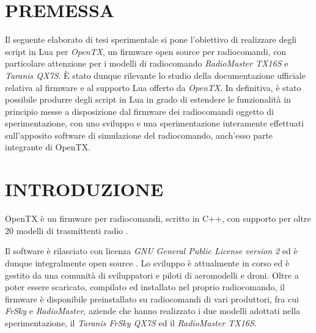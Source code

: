 \documentclass[a4paper, 12pt]{report} %
\begin{document}


\tableofcontents %
\fontsize{12pt}{14pt}\selectfont %

\titleformat{\chapter}[display]
{\Huge\bfseries}{}{0pt}{\thechapter\ \ \ \ }
\newpage
\clearpage
\chapter{PREMESSA}
Il seguente elaborato di tesi sperimentale si pone l'obiettivo di realizzare degli script in Lua per \emph{OpenTX}, un firmware open source per radiocomandi, con particolare attenzione per i modelli di radiocomando \emph{RadioMaster TX16S} e \emph{Taranis QX7S}. È stato dunque rilevante lo studio della documentazione ufficiale relativa al firmware e al supporto Lua offerto da \emph{OpenTX}. In definitiva, è stato possibile produrre degli script in Lua in grado di estendere le funzionalità in principio messe a disposizione dal firmware dei radiocomandi oggetto di sperimentazione, con uno sviluppo e una sperimentazione interamente effettuati sull'apposito software di simulazione del radiocomando, anch'esso parte integrante di OpenTX.

\clearpage


\chapter{INTRODUZIONE}

OpenTX \cite{opentx-website} è un firmware per radiocomandi, scritto in C++, con supporto per oltre 20 modelli di trasmittenti radio \cite{opentx-radios}.

Il software è rilasciato con licenza \emph{GNU General Public License version 2} ed è dunque integralmente open source \cite{opentx-github}. Lo sviluppo è attualmente in corso ed è gestito da una comunità di sviluppatori e piloti di aeromodelli e droni. Oltre a poter essere scaricato, compilato ed installato nel proprio radiocomando, il firmware è disponibile preinstallato su radiocomandi di vari produttori, fra cui \emph{FrSky} e \emph{RadioMaster}, aziende che hanno realizzato i due modelli adottati nella sperimentazione, il \emph{Taranis FrSky QX7S} ed il \emph{RadioMaster TX16S}.
\end{document}
